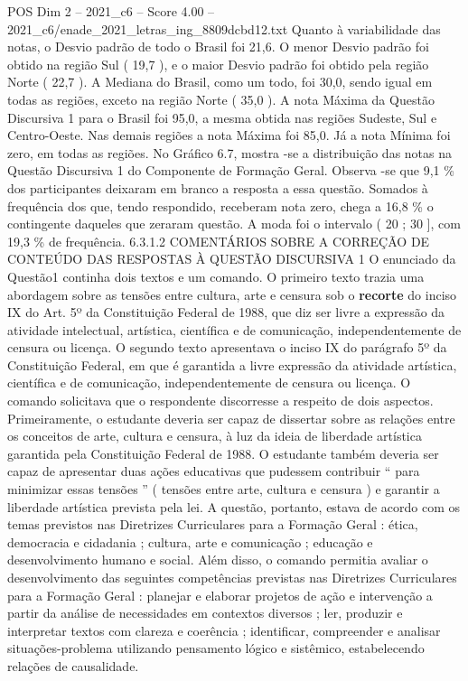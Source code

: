 \begin{textsample}{POS Dim 2 – 2021\_c6 – Score 4.00 – 2021\_c6/enade\_2021\_letras\_ing\_8809dcbd12.txt}
Quanto à variabilidade das notas, o Desvio padrão de todo o Brasil foi 21,6.
O menor Desvio padrão foi obtido na região Sul ( 19,7 ), e o maior Desvio padrão foi obtido pela região Norte ( 22,7 ).
A Mediana do Brasil, como um todo, foi 30,0, sendo igual em todas as regiões, exceto na região Norte ( 35,0 ).
A nota Máxima da Questão Discursiva 1 para o Brasil foi 95,0, a mesma obtida nas regiões Sudeste, Sul e Centro-Oeste.
Nas demais regiões a nota Máxima foi 85,0.
Já a nota Mínima foi zero, em todas as regiões.
No Gráfico 6.7, mostra -se a distribuição das notas na Questão Discursiva 1 do Componente de Formação Geral.
Observa -se que 9,1 \% dos participantes deixaram em branco a resposta a essa questão.
Somados à frequência dos que, tendo respondido, receberam nota zero, chega a 16,8 \% o contingente daqueles que zeraram questão.
A moda foi o intervalo ( 20 ; 30 ], com 19,3 \% de frequência. 6.3.1.2 COMENTÁRIOS SOBRE A CORREÇÃO DE CONTEÚDO DAS RESPOSTAS À QUESTÃO DISCURSIVA 1 O enunciado da Questão1 continha dois textos e um comando.
O primeiro texto trazia uma abordagem sobre as tensões entre cultura, arte e censura sob o \textbf{recorte} do inciso IX do Art. 5º da Constituição Federal de 1988, que diz ser livre a expressão da atividade intelectual, artística, científica e de comunicação, independentemente de censura ou licença.
O segundo texto apresentava o inciso IX do parágrafo 5º da Constituição Federal, em que é garantida a livre expressão da atividade artística, científica e de comunicação, independentemente de censura ou licença.
O comando solicitava que o respondente discorresse a respeito de dois aspectos.
Primeiramente, o estudante deveria ser capaz de dissertar sobre as relações entre os conceitos de arte, cultura e censura, à luz da ideia de liberdade artística garantida pela Constituição Federal de 1988.
O estudante também deveria ser capaz de apresentar duas ações educativas que pudessem contribuir “ para minimizar essas tensões ” ( tensões entre arte, cultura e censura ) e garantir a liberdade artística prevista pela lei.
A questão, portanto, estava de acordo com os temas previstos nas Diretrizes Curriculares para a Formação Geral : ética, democracia e cidadania ; cultura, arte e comunicação ; educação e desenvolvimento humano e social.
Além disso, o comando permitia avaliar o desenvolvimento das seguintes competências previstas nas Diretrizes Curriculares para a Formação Geral : planejar e elaborar projetos de ação e intervenção a partir da análise de necessidades em contextos diversos ; ler, produzir e interpretar textos com clareza e coerência ; identificar, compreender e analisar situações-problema utilizando pensamento lógico e sistêmico, estabelecendo relações de causalidade.

\end{textsample}
